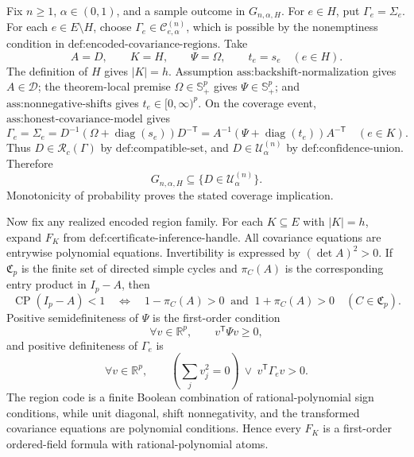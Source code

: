 Fix \(n\geq1\), \(\alpha\in(0,1)\), and a sample outcome in \(G_{n,\alpha,H}\).  For \(e\in H\), put \(\Gamma_e=\Sigma_e\).  For each \(e\in E\setminus H\), choose \(\Gamma_e\in\mathcal C^{(n)}_{e,\alpha}\), which is possible by the nonemptiness condition in \(\text{def:encoded-covariance-regions}\).  Take
\[
 A=D,\qquad K=H,\qquad\Psi=\Omega,\qquad t_e=s_e\quad(e\in H).
\]
The definition of \(H\) gives \(|K|=h\).  Assumption \(\text{ass:backshift-normalization}\) gives \(A\in\mathcal D\); the theorem-local premise \(\Omega\in\mathbb S_+^p\) gives \(\Psi\in\mathbb S_+^p\); and \(\text{ass:nonnegative-shifts}\) gives \(t_e\in[0,\infty)^p\).  On the coverage event, \(\text{ass:honest-covariance-model}\) gives
\[
 \Gamma_e=\Sigma_e
 =D^{-1}(\Omega+\operatorname{diag}(s_e))D^{-\mathsf T}
 =A^{-1}(\Psi+\operatorname{diag}(t_e))A^{-\mathsf T}
 \quad(e\in K).
\]
Thus \(D\in\mathcal R_c(\Gamma)\) by \(\text{def:compatible-set}\), and \(D\in\mathcal U^{(n)}_\alpha\) by \(\text{def:confidence-union}\).  Therefore
\[
 G_{n,\alpha,H}\subseteq\{D\in\mathcal U^{(n)}_\alpha\}.
\]
Monotonicity of probability proves the stated coverage implication.

Now fix any realized encoded region family.  For each \(K\subseteq E\) with \(|K|=h\), expand \(F_K\) from \(\text{def:certificate-inference-handle}\).  All covariance equations are entrywise polynomial equations.  Invertibility is expressed by \((\det A)^2>0\).  If \(\mathfrak C_p\) is the finite set of directed simple cycles and \(\pi_C(A)\) is the corresponding entry product in \(I_p-A\), then
\[
 \operatorname{CP}(I_p-A)<1
 \quad\Longleftrightarrow\quad
 1-\pi_C(A)>0\ \text{ and }\ 1+\pi_C(A)>0
 \quad(C\in\mathfrak C_p).
\]
Positive semidefiniteness of \(\Psi\) is the first-order condition
\[
 \forall v\in\mathbb R^p,\qquad v^{\mathsf T}\Psi v\geq0,
\]
and positive definiteness of \(\Gamma_e\) is
\[
 \forall v\in\mathbb R^p,\qquad
 \left(\sum_jv_j^2=0\right)\ \vee\ v^{\mathsf T}\Gamma_ev>0.
\]
The region code is a finite Boolean combination of rational-polynomial sign conditions, while unit diagonal, shift nonnegativity, and the transformed covariance equations are polynomial conditions.  Hence every \(F_K\) is a first-order ordered-field formula with rational-polynomial atoms.

